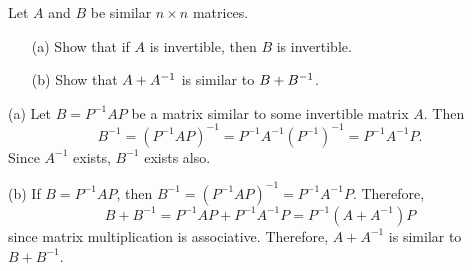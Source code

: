 \documentclass{ximera}
\begin{document}
\begin{exercise} \label{c10.3.4}
Let $A$ and $B$ be similar $n\times n$ matrices.
\begin{itemize}
\item[(a)]  Show that if $A$ is invertible, then $B$ is invertible.
\item[(b)]  Show that $A+A^{-1}$ is similar to $B+B^{-1}$.
\end{itemize}

\begin{solution}

(a) Let $B = P^{-1}AP$ be a matrix similar to some invertible matrix $A$.
Then 
\[
B^{-1} = (P^{-1}AP)^{-1} = P^{-1}A^{-1}(P^{-1})^{-1} = P^{-1}A^{-1}P.
\]
Since $A^{-1}$ exists, $B^{-1}$ exists also.

(b) If $B = P^{-1}AP$, then $B^{-1} = (P^{-1}AP)^{-1} = P^{-1}A^{-1}P$.
Therefore,
\[
B + B^{-1} = P^{-1}AP + P^{-1}A^{-1}P = P^{-1}(A + A^{-1})P
\]
since matrix multiplication is associative.  Therefore, $A + A^{-1}$ is
similar to $B + B^{-1}$.

\end{solution}
\end{exercise}
\end{document}
